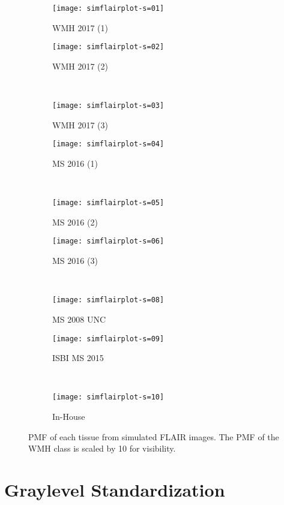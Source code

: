 \begin{figure}
  \centering
  \begin{subfigure}{\plotwidth}
    \centering\texttt{[image: simflairplot-s=01]}
    \caption{WMH 2017 (1)}
  \end{subfigure}
  \begin{subfigure}{\plotwidth}
    \centering\texttt{[image: simflairplot-s=02]}
    \caption{WMH 2017 (2)}
  \end{subfigure}\\[0.5em]
  \begin{subfigure}{\plotwidth}
    \centering\texttt{[image: simflairplot-s=03]}
    \caption{WMH 2017 (3)}
  \end{subfigure}
  \begin{subfigure}{\plotwidth}
    \centering\texttt{[image: simflairplot-s=04]}
    \caption{MS  2016 (1)}
  \end{subfigure}\\[0.5em]
  \begin{subfigure}{\plotwidth}
    \centering\texttt{[image: simflairplot-s=05]}
    \caption{MS  2016 (2)}
  \end{subfigure}
  \begin{subfigure}{\plotwidth}
    \centering\texttt{[image: simflairplot-s=06]}
    \caption{MS  2016 (3)}
  \end{subfigure}\\[0.5em]
  \begin{subfigure}{\plotwidth}
    \centering\texttt{[image: simflairplot-s=08]}
    \caption{MS  2008 UNC}
  \end{subfigure}
  \begin{subfigure}{\plotwidth}
    \centering\texttt{[image: simflairplot-s=09]}
    \caption{ISBI MS 2015}
  \end{subfigure}\\[0.5em]
  \begin{subfigure}{\plotwidth}
    \centering\texttt{[image: simflairplot-s=10]}
    \caption{In-House}
  \end{subfigure}
  \caption{PMF of each tissue from simulated FLAIR images.
    The PMF of the WMH class is scaled by 10 for visibility.}%
  \label{fig:simflairplot}
\end{figure}
\section{Graylevel Standardization}
